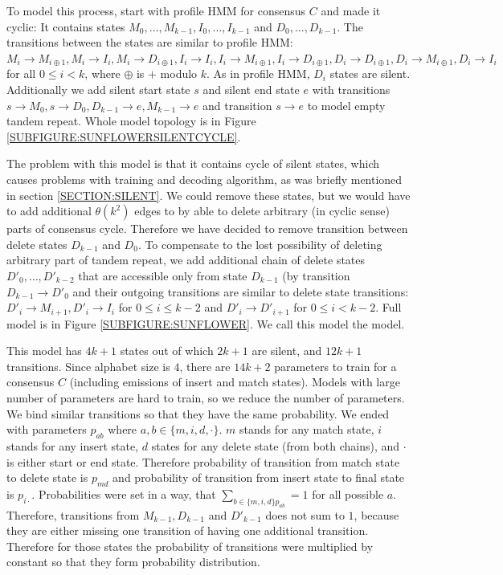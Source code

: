 To model this process, start with profile HMM for consensus $C$ and made it
cyclic: It contains states $M_0,\dots, M_{k-1}, I_{0}, \dots, I_{k-1}$ and
$D_{0}, \dots, D_{k-1}$. The transitions between the states are similar to
profile HMM:  $M_{i}\to M_{i\oplus 1}, M_i\to I_i, M_i\to D_{i\oplus 1}, I_i\to
I_i, I_i\to M_{i\oplus 1}, I_i\to D_{i\oplus 1}, D_{i}\to D_{i \oplus 1},
D_{i}\to M_{i\oplus 1}, D_{i}\to I_i$ for all $0\leq i < k$, where $\oplus$ is
$+$ modulo $k$. As in profile HMM, $D_i$ states are silent. Additionally we add
silent start state $s$ and silent end state $e$ with transitions $s\to M_0,
s\to D_0, D_{k-1}\to e, M_{k-1}\to e$ and transition $s\to e$ to model empty
tandem repeat.  Whole model topology is in Figure
\ref{SUBFIGURE:SUNFLOWERSILENTCYCLE}.

The problem with this model is that it contains cycle of silent states, which
causes problems with training and decoding algorithm, as was briefly mentioned
in section \ref{SECTION:SILENT}. We could remove these states, but we would
have to add additional $\theta(k^2)$ edges to by able to delete arbitrary (in
cyclic sense) parts of consensus cycle. Therefore we have decided to remove
transition between delete states $D_{k-1}$ and $D_0$. To compensate to the lost
possibility of deleting arbitrary part of tandem repeat, we add additional
chain of delete states $D'_0, \dots, D'_{k-2}$ that are accessible only from
state $D_{k-1}$ (by transition $D_{k-1}\to D'_0$ and their outgoing
transitions are similar to delete state transitions: $D'_{i}\to M_{i+1},
D'_{i}\to I_i$ for $0\leq i\leq k-2$ and $D'_{i} \to D'_{i+1}$ for $0\leq i <
k-2$. Full model is in Figure \ref{SUBFIGURE:SUNFLOWER}. We call this model the
 model.

 This model has $4k+1$ states
out of which $2k+1$ are silent, and $12k+1$ transitions. Since alphabet size is
$4$, there are $14k+2$ parameters to train for a consensus $C$ (including
emissions of insert and match states). Models with large number of parameters
are hard to train, so we reduce the number of parameters. We bind similar
transitions so that they have the same probability.  We ended with parameters
$p_{ab}$ where $a,b\in \{m, i, d, \cdot\}$. $m$ stands for any match state, $i$
stands for any insert state, $d$ states for any delete state (from both
chains), and $\cdot$ is either start or end state. Therefore probability of
transition from match state to delete state is $p_{md}$ and probability of
transition from insert state to final state is $p_{i\cdot}$.  Probabilities
were set in a way, that $\sum_{b\in\{m,i,d\}p_{ab}}=1$ for all possible $a$.
Therefore, transitions from $M_{k-1}, D_{k-1}$ and $D'_{k-1}$ does not sum to
$1$, because they are either missing one transition of having one additional
transition. Therefore for those states the probability of transitions were
multiplied by constant so that they form probability distribution.


